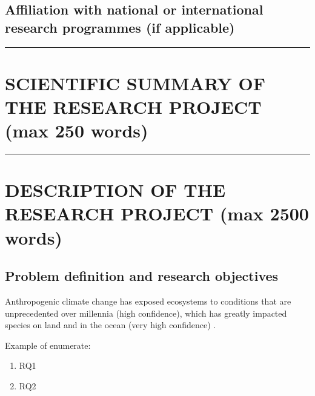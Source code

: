 \documentclass{article}
\begin{document}


\subsection{Affiliation with national or international research programmes (if applicable)}


\begin{center}
    \rule{\textwidth}{0.5pt}
\end{center}
\section{SCIENTIFIC SUMMARY OF THE RESEARCH PROJECT (max 250 words)}


\begin{center}
    \rule{\textwidth}{0.5pt}
\end{center}

\section{DESCRIPTION OF THE RESEARCH PROJECT (max 2500 words)}

\subsection{Problem definition and research objectives}


Anthropogenic climate change has exposed ecosystems to conditions that are unprecedented over millennia (high confidence), which has greatly impacted species on land and in the ocean (very high confidence) \cite{ipccTechnicalSummaryClimate2023}. 

Example of enumerate:
\begin{enumerate}
    \item RQ1
    \item RQ2
\end{enumerate}

\begin{tcolorbox}[title=Example of color box, colback=white, colframe=black, rounded corners, parbox=false, breakable]

    \blindtext

\end{tcolorbox}
\end{document}
